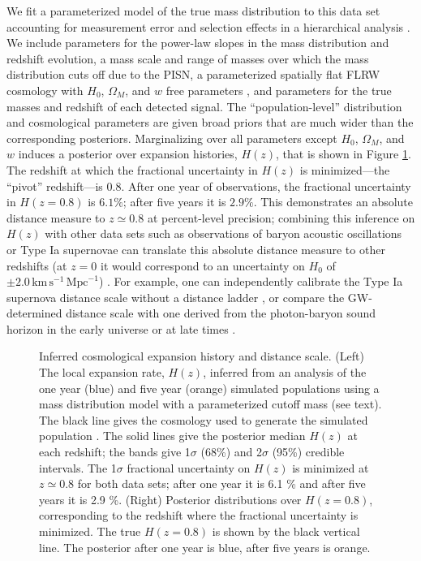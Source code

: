 \documentclass[modern]{aastex62}
\newcommand{\SigmaHPvtOneYear}{6.1 \%}
\newcommand{\SigmaHPvtFiveYear}{2.9 \%}
\newcommand{\SigmaHNaughtTransFiveYear}{2.0}
\newcommand{\zpivot}{0.8}
\newcommand{\kmsMpc}{\mathrm{km} \, \mathrm{s}^{-1} \, \mathrm{Mpc}^{-1}}
\begin{document}
We fit a parameterized model of the true mass distribution to this data set
accounting for measurement error and selection effects in a hierarchical
analysis \citep{Hogg2010,Mandel2010,Loredo2004,Mandel2019,Farr2019}.  We include
parameters for the power-law slopes in the mass distribution and redshift
evolution, a mass scale and range of masses over which the mass distribution
cuts off due to the \ac{PISN}, a parameterized spatially flat FLRW cosmology
with $H_0$, $\Omega_M$, and $w$ free parameters \citep{Hogg1999}, and parameters
for the true masses and redshift of each detected signal.  The
``population-level'' distribution and cosmological parameters are given broad
priors that are much wider than the corresponding posteriors.  Marginalizing
over all parameters except $H_0$, $\Omega_M$, and $w$ induces a posterior over
expansion histories, $H(z)$, that is shown in Figure \ref{fig:Hz}.  The redshift
at which the fractional uncertainty in $H(z)$ is minimized---the ``pivot''
redshift---is $\zpivot{}$.  After one year of observations, the fractional
uncertainty in $H(z = \zpivot)$ is $\SigmaHPvtOneYear{}$; after five years it is
$\SigmaHPvtFiveYear{}$.  This demonstrates an absolute distance measure to $z
\simeq \zpivot{}$ at percent-level precision; combining this inference on $H(z)$
with other data sets such as observations of baryon acoustic oscillations
\citep{BOSS2015} or Type Ia supernovae \citep{Scolnic2018} can translate this
absolute distance measure to other redshifts (at $z = 0$ it would correspond to
an uncertainty on $H_0$ of $\pm \SigmaHNaughtTransFiveYear{} \, \kmsMpc$)
\citep{BOSS2015,Cuesta2015,Feeney2019}. For example, one can independently
calibrate the Type Ia supernova distance scale without a distance ladder
\citep{Feeney2019,Scolnic2018}, or compare the \ac{GW}-determined distance scale
with one derived from the photon-baryon sound horizon
\citep{Cuesta2015,Aylor2019} in the early universe \citep{Planck2016} or at late
times \citep{BOSS2015}.

\begin{figure}
%
  \caption{\label{fig:Hz} Inferred cosmological expansion history and distance
  scale.  (Left) The local expansion rate, $H(z)$, inferred from an analysis of
  the one year (blue) and five year (orange) simulated populations using a mass
  distribution model with a parameterized cutoff mass (see text).  The black
  line gives the cosmology used to generate the simulated population \citep[TT,
  TE, EE + lowP + lensing + ext]{Planck2016}.  The solid lines give the
  posterior median $H(z)$ at each redshift; the bands give 1$\sigma$ (68\%) and
  2$\sigma$ (95\%) credible intervals.  The 1$\sigma$ fractional uncertainty on
  $H(z)$ is minimized at $z \simeq \zpivot{}$ for both data sets; after one year
  it is \SigmaHPvtOneYear{} and after five years it is \SigmaHPvtFiveYear{}.
  (Right) Posterior distributions over $H\left(z = \zpivot{}\right)$,
  corresponding to the redshift where the fractional uncertainty is minimized.
  The true $H\left( z = \zpivot{} \right)$ is shown by the black vertical line.
  The posterior after one year is blue, after five years is orange. }
%
\end{figure}
\end{document}
